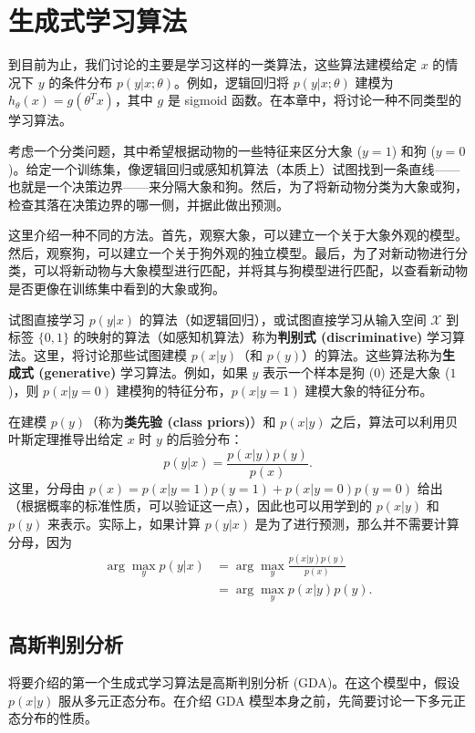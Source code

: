 \chapter{生成式学习算法}

到目前为止，我们讨论的主要是学习这样的一类算法，这些算法建模给定 $x$ 的情况下 $y$ 的条件分布 $p(y|x; \theta)$。例如，逻辑回归将 $p(y|x; \theta)$ 建模为 $h_\theta(x) = g(\theta^T x)$，其中 $g$ 是 sigmoid 函数。在本章中，将讨论一种不同类型的学习算法。

考虑一个分类问题，其中希望根据动物的一些特征来区分大象 ($y=1$) 和狗 ($y=0$)。给定一个训练集，像逻辑回归或感知机算法（本质上）试图找到一条直线——也就是一个决策边界——来分隔大象和狗。然后，为了将新动物分类为大象或狗，检查其落在决策边界的哪一侧，并据此做出预测。

这里介绍一种不同的方法。首先，观察大象，可以建立一个关于大象外观的模型。然后，观察狗，可以建立一个关于狗外观的独立模型。最后，为了对新动物进行分类，可以将新动物与大象模型进行匹配，并将其与狗模型进行匹配，以查看新动物是否更像在训练集中看到的大象或狗。

试图直接学习 $p(y|x)$ 的算法（如逻辑回归），或试图直接学习从输入空间 $\mathcal{X}$ 到标签 $\{0, 1\}$ 的映射的算法（如感知机算法）称为\textbf{判别式 (discriminative)} 学习算法。这里，将讨论那些试图建模 $p(x|y)$（和 $p(y)$）的算法。这些算法称为\textbf{生成式 (generative)} 学习算法。例如，如果 $y$ 表示一个样本是狗 ($0$) 还是大象 ($1$)，则 $p(x|y=0)$ 建模狗的特征分布，$p(x|y=1)$ 建模大象的特征分布。

在建模 $p(y)$（称为\textbf{类先验 (class priors)}）和 $p(x|y)$ 之后，算法可以利用贝叶斯定理推导出给定 $x$ 时 $y$ 的后验分布：
\[
    p(y|x) = \frac{p(x|y)p(y)}{p(x)}.
\]
这里，分母由 $p(x) = p(x|y=1)p(y=1) + p(x|y=0)p(y=0)$ 给出（根据概率的标准性质，可以验证这一点），因此也可以用学到的 $p(x|y)$ 和 $p(y)$ 来表示。实际上，如果计算 $p(y|x)$ 是为了进行预测，那么并不需要计算分母，因为
\[
\begin{aligned}
    \arg \max_y p(y|x) &= \arg \max_y \frac{p(x|y)p(y)}{p(x)} \\
    &= \arg \max_y p(x|y)p(y).
\end{aligned}
\]

\section{高斯判别分析}

将要介绍的第一个生成式学习算法是高斯判别分析 (GDA)。在这个模型中，假设 $p(x|y)$ 服从多元正态分布。在介绍 GDA 模型本身之前，先简要讨论一下多元正态分布的性质。

